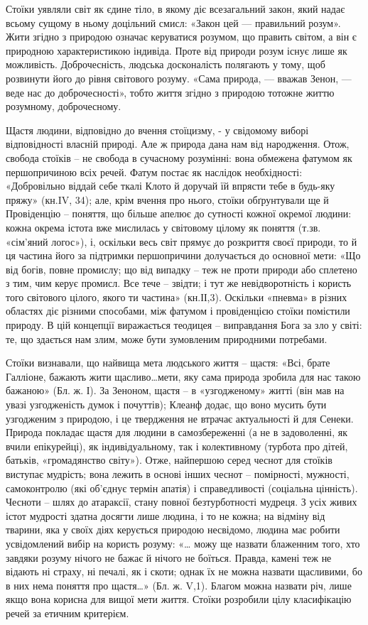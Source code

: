 \documentclass[14pt]{extarticle} %
\begin{document}
Стоїки уявляли світ як єдине тіло, в якому діє всезагальний закон, який надає всьому сущому в ньому доцільний смисл: «Закон цей — правильний розум». Жити згідно з природою означає керуватися розумом, що править світом, а він є природною характеристикою індивіда. Проте від природи розум існує лише як можливість. Доброчесність, людська досконалість полягають у тому, щоб розвинути його до рівня світового розуму. «Сама природа, — вважав Зенон, — веде нас до доброчесності», тобто життя згідно з природою тотожне життю розумному, доброчесному.

Щастя людини, відповідно до вчення стоїцизму, - у свідомому виборі відповідності власній природі. Але ж природа дана нам від народження.
Отож, свобода стоїків – не свобода в сучасному розумінні: вона обмежена фатумом як першопричиною всіх речей. Фатум постає як наслідок необхідності:
«Добровільно віддай себе ткалі Клото й доручай їй впрясти тебе в будь-яку пряжу» (кн.IV, 34); але, крім вчення про нього, стоїки обґрунтували ще
й Провіденцію – поняття, що більше апелює до сутності кожної окремої людини: кожна окрема істота вже мислилась у світовому цілому як поняття
(т.зв. «сім’яний логос»), і, оскільки весь світ прямує до розкриття своєї природи, то й ця частина його за підтримки першопричини долучається до
основної мети: «Що від богів, повне промислу; що від випадку – теж не проти природи або сплетено з тим, чим керує промисл. Все тече – звідти;
і тут же невідворотність і користь того світового цілого, якого ти частина» (кн.ІІ,3). Оскільки «пневма» в різних областях діє різними
способами, між фатумом і провіденцією стоїки помістили природу. В цій концепції виражається теодицея – виправдання Бога за зло у
світі: те, що здається нам злим, може бути зумовленим природними потребами.

Стоїки визнавали, що найвища мета людського життя – щастя: «Всі, брате Галліоне, бажають жити щасливо…мети, яку сама природа зробила для нас такою бажаною» (Бл. ж. І). За Зеноном, щастя – в «узгодженому» житті (він мав на увазі узгодженість думок і почуттів); Клеанф додає, що воно мусить бути узгодженим з природою, і це твердження не втрачає актуальності й для Сенеки. Природа покладає щастя для людини в самозбереженні (а не в задоволенні,
як вчили епікурейці), як індивідуальному, так і колективному (турбота про дітей, батьків, «громадянство світу»). Отже, найпершою серед
чеснот для стоїків виступає мудрість; вона лежить в основі інших чеснот – помірності, мужності, самоконтролю (які об’єднує термін апатія)
і справедливості (соціальна цінність). Чесноти – шлях до атараксії, стану повної безтурботності мудреця. З усіх живих істот мудрості
здатна досягти лише людина, і то не кожна; на відміну від тварини, яка у своїх діях керується природою несвідомо, людина має робити усвідомлений
вибір на користь розуму: «… можу ще назвати блаженним того, хто завдяки розуму нічого не бажає й нічого не боїться. Правда, камені теж не
відають ні страху, ні печалі, як і скоти; однак їх не можна назвати щасливими, бо в них нема поняття про щастя…» (Бл. ж. V,1).
Благом можна назвати річ, лише якщо вона корисна для вищої мети життя. Стоїки розробили цілу класифікацію речей за етичним критерієм.
\end{document}
